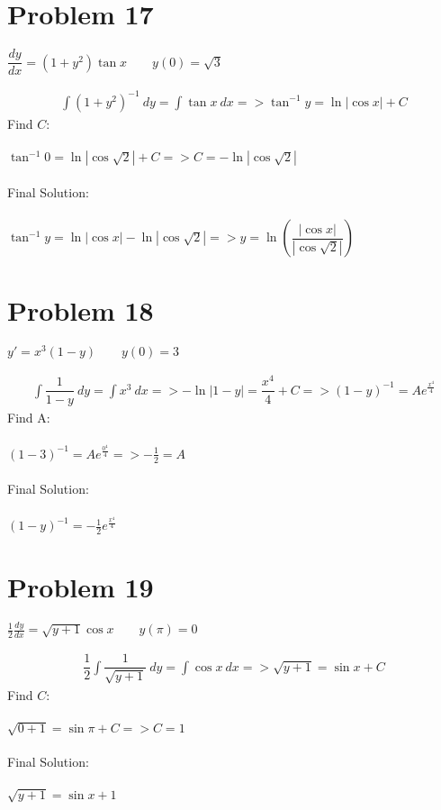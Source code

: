 \documentclass[12pt]{exam}
\begin{document}
\section*{Problem 17}
\begin{center}$\dfrac{dy}{dx}=(1+y^2)\tan{x}\qquad y(0)=\sqrt{3}$\end{center}
\large\begin{eqnarray*}
    \int(1+y^2)^{-1}\:dy=\int\tan{x}\:dx=>\tan^{-1}{y}=\ln{|\cos{x}|}+C
\end{eqnarray*}
Find $C$:\\\\
$\tan^{-1}{0}=\ln{|\cos{\sqrt{2}}|}+C=>C=-\ln{|\cos{\sqrt{2}}|}$\\\\
Final Solution:\\\\
$\tan^{-1}{y}=\ln{|\cos{x}|}-\ln{|\cos{\sqrt{2}}|}=>y=\ln{\left(\dfrac{|\cos{x}|}{|\cos{\sqrt{2}}|}\right)}$
\section*{Problem 18}
\begin{center}$y'=x^3(1-y) \qquad y(0)=3$\end{center}
\large\begin{eqnarray*}
    \int\dfrac{1}{1-y}\:dy=\int x^3\:dx=>-\ln{|1-y|}=\dfrac{x^4}{4}+C=>(1-y)^{-1}=Ae^{\frac{x^4}{4}}
\end{eqnarray*}
Find A:\\\\
$(1-3)^{-1}=Ae^{\frac{0^4}{4}}=>-\frac{1}{2}=A$\\\\
Final Solution:\\\\
$(1-y)^{-1}=-\frac{1}{2}e^{\frac{x^4}{4}}$
\section*{Problem 19}
\begin{center}$\frac{1}{2}\frac{dy}{dx}=\sqrt{y+1}\cos{x} \qquad y(\pi)=0$\end{center}
\large\begin{eqnarray*}
    \dfrac{1}{2}\int\dfrac{1}{\sqrt{y+1}}\:dy=\int\cos{x}\:dx=>\sqrt{y+1}=\sin{x}+C
\end{eqnarray*}
Find $C$:\\\\
$\sqrt{0+1}=\sin{\pi}+C=>C=1$\\\\
Final Solution:\\\\
$\sqrt{y+1}=\sin{x}+1$
\pagebreak
\end{document}

